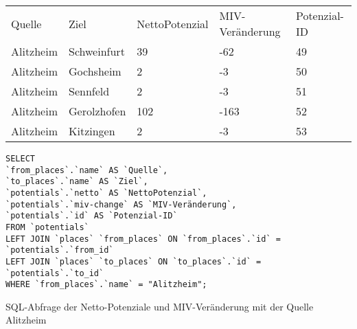 \begin{tabular}{ l  l  l  l  l }
Quelle & Ziel & NettoPotenzial & MIV-Veränderung & Potenzial-ID\\ 
Alitzheim & Schweinfurt & 39 & -62 & 49\\ 
Alitzheim & Gochsheim & 2 & -3 & 50\\ 
Alitzheim & Sennfeld & 2 & -3 & 51\\ 
Alitzheim & Gerolzhofen & 102 & -163 & 52\\ 
Alitzheim & Kitzingen & 2 & -3 & 53\\ 
\end{tabular}        
\newline
\newline
\begin{listing}[htbp]
\begin{verbatim}
SELECT
`from_places`.`name` AS `Quelle`, 
`to_places`.`name` AS `Ziel`, 
`potentials`.`netto` AS `NettoPotenzial`, 
`potentials`.`miv-change` AS `MIV-Veränderung`, 
`potentials`.`id` AS `Potenzial-ID`
FROM `potentials`
LEFT JOIN `places` `from_places` ON `from_places`.`id` = `potentials`.`from_id`
LEFT JOIN `places` `to_places` ON `to_places`.`id` = `potentials`.`to_id`
WHERE `from_places`.`name` = "Alitzheim";
\end{verbatim}
\caption{SQL-Abfrage der Netto-Potenziale und MIV-Veränderung mit der Quelle Alitzheim}\label{lst-fz-alitzheim}
\end{listing}